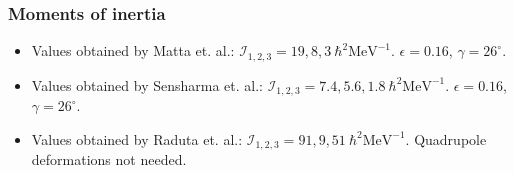 \documentclass{beamer}
\begin{document}
\begin{frame}
	\frametitle{Moments of inertia}

	\begin{itemize}
		\item Values obtained by Matta et. al.: $\mathcal{I}_{1,2,3}=19,8,3\ \hbar^2\text{MeV}^{-1}$. $\epsilon=0.16$, $\gamma=26^\circ$.
		\item Values obtained by Sensharma et. al.: $\mathcal{I}_{1,2,3}=7.4,5.6,1.8\ \hbar^2\text{MeV}^{-1}$. $\epsilon=0.16$, $\gamma=26^\circ$.
		\item Values obtained by Raduta et. al.: $\mathcal{I}_{1,2,3}=91,9,51\ \hbar^2\text{MeV}^{-1}$. Quadrupole deformations not needed.
	\end{itemize}

\end{frame}
\end{document}
